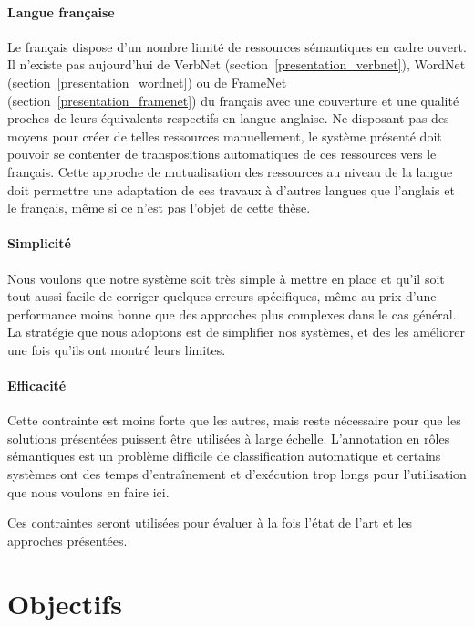 \paragraph{Langue française} Le français dispose d'un nombre limité de
ressources sémantiques en cadre ouvert. Il n'existe pas aujourd'hui de VerbNet
(section~\ref{presentation_verbnet}), WordNet
(section~\ref{presentation_wordnet}) ou de FrameNet
(section~\ref{presentation_framenet}) du français avec une couverture et une
qualité proches de leurs équivalents respectifs en langue anglaise. Ne
disposant pas des moyens pour créer de telles ressources manuellement, le
système présenté doit pouvoir se contenter de transpositions automatiques de
ces ressources vers le français.  Cette approche de mutualisation des
ressources au niveau de la langue doit permettre une adaptation de ces travaux
à d'autres langues que l'anglais et le français, même si ce n'est pas l'objet
de cette thèse.

\paragraph{Simplicité} Nous voulons que notre système soit très simple à mettre
en place et qu'il soit tout aussi facile de corriger quelques erreurs
spécifiques, même au prix d'une performance moins bonne que des approches plus
complexes dans le cas général. La stratégie que nous adoptons est de simplifier
nos systèmes, et des les améliorer une fois qu'ils ont montré leurs limites.

\paragraph{Efficacité} Cette contrainte est moins forte que les autres, mais
reste nécessaire pour que les solutions présentées puissent être utilisées à
large échelle. L'annotation en rôles sémantiques est un problème difficile de
classification automatique et certains systèmes ont des temps d'entraînement et
d'exécution trop longs pour l'utilisation que nous voulons en faire ici.

Ces contraintes seront utilisées pour évaluer à la fois l'état de l'art et les
approches présentées.

\section{Objectifs}
\label{objectifs_these}


